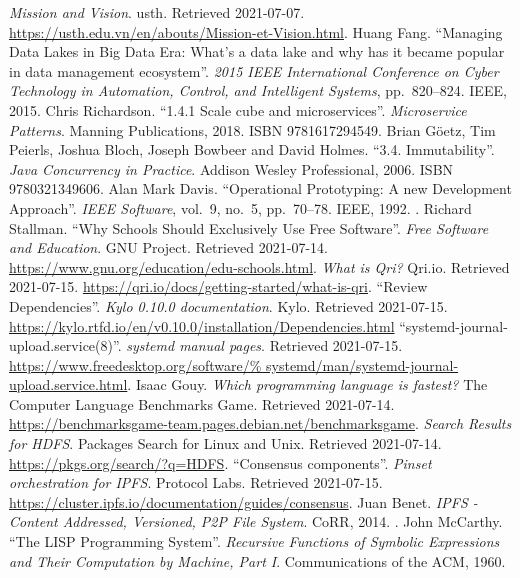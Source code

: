 \begin{thebibliography}{69}
   \emph{Mission and Vision}.
    \acrlong{usth}.  Retrieved 2021-07-07.
    \url{https://usth.edu.vn/en/abouts/Mission-et-Vision.html}.
   Huang Fang.
    ``Managing Data Lakes in Big Data Era: What's a data lake
    and why has it became popular in data management ecosystem''.
    \emph{2015 IEEE International Conference on Cyber Technology
    in Automation, Control, and Intelligent Systems}, pp.~820--824.
    IEEE, 2015.  
   Chris Richardson.
    ``1.4.1 Scale cube and microservices''.  \emph{Microservice Patterns}.
    Manning Publications, 2018.  ISBN 9781617294549.
   Brian Göetz, Tim Peierls, Joshua Bloch,
    Joseph Bowbeer and David Holmes.
    ``3.4. Immutability''.  \emph{Java Concurrency in Practice}.
    Addison Wesley Professional, 2006.  ISBN 9780321349606.
   Alan Mark Davis.
    ``Operational Prototyping: A new Development Approach''.
    \emph{IEEE Software}, vol.~9, no.~5, pp.~70--78.
    IEEE, 1992.  .
   Richard Stallman.
    ``Why Schools Should Exclusively Use Free Software''.
    \emph{Free Software and Education}.  GNU Project.  Retrieved 2021-07-14.
    \url{https://www.gnu.org/education/edu-schools.html}.
   \emph{What is Qri?} Qri.io.  Retrieved 2021-07-15.
    \url{https://qri.io/docs/getting-started/what-is-qri}.
   ``Review Dependencies''.  \emph{Kylo 0.10.0 documentation}.
    Kylo.  Retrieved 2021-07-15.
    \url{https://kylo.rtfd.io/en/v0.10.0/installation/Dependencies.html}
   ``systemd-journal-upload.service(8)''.
    \emph{systemd manual pages}.  Retrieved 2021-07-15.
    \url{https://www.freedesktop.org/software/%
         systemd/man/systemd-journal-upload.service.html}.
   Isaac Gouy.
    \emph{Which programming language is fastest?}
    The Computer Language Benchmarks Game.
    Retrieved 2021-07-14.
    \url{https://benchmarksgame-team.pages.debian.net/benchmarksgame}.
   \emph{Search Results for HDFS}.
    Packages Search for Linux and Unix.
    Retrieved 2021-07-14.  \url{https://pkgs.org/search/?q=HDFS}.
   ``Consensus components''.
    \emph{Pinset orchestration for IPFS}.
    Protocol Labs.  Retrieved 2021-07-15.
    \url{https://cluster.ipfs.io/documentation/guides/consensus}.
   Juan Benet.
    \emph{IPFS - Content Addressed, Versioned, P2P File System}.
    CoRR, 2014.  .
   John McCarthy.
    ``The LISP Programming System''.
    \emph{Recursive Functions of Symbolic Expressions
    and Their Computation by Machine, Part I}.
    Communications of the ACM, 1960.
\end{thebibliography}
